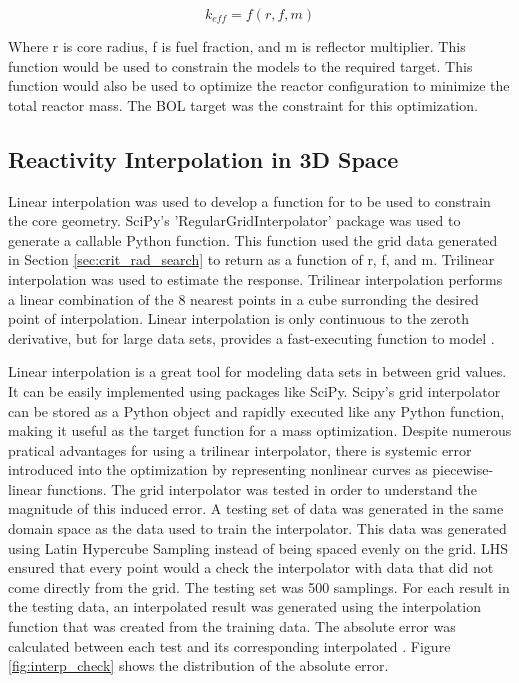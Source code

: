 \begin{equation}
    k_{eff} = f(r, f, m)
\label{eq:gen_keff}
\end{equation}

Where r is core radius, f is fuel fraction, and m is reflector multiplier. This
function would be used to constrain the models to the required \keff target.
This function would also be used to optimize the reactor configuration to
minimize the total reactor mass. The BOL \keff target was the constraint for
this optimization.

\subsection{Reactivity Interpolation in 3D Space}
Linear interpolation was used to develop a function for \keff to be used to
constrain the core geometry. SciPy's 'RegularGridInterpolator' package was used
to generate a callable Python function. This function used the grid data
generated in Section \ref{sec:crit_rad_search} to return \keff as a function of
r, f, and m. Trilinear interpolation was used to estimate the \keff response.
Trilinear interpolation performs a linear combination of the 8 nearest points in
a cube surronding the desired point of interpolation. Linear interpolation is
only continuous to the zeroth derivative, but for large data sets, provides a
fast-executing function to model \keff.

Linear interpolation is a great tool for modeling data sets in between grid
values. It can be easily implemented using packages like SciPy. Scipy's grid
interpolator can be stored as a Python object and rapidly executed like any
Python function, making it useful as the target function for a mass
optimization. Despite numerous pratical advantages for using a trilinear
interpolator, there is systemic error introduced into the optimization by
representing nonlinear curves as piecewise-linear functions. The grid
interpolator was tested in order to understand the magnitude of this induced
error. A testing set of data was generated in the same domain space as the data
used to train the interpolator. This data was generated using Latin Hypercube
Sampling instead of being spaced evenly on the grid. LHS ensured that every
point would a check the interpolator with data that did not come directly from
the grid. The testing set was 500 \keff samplings. For each \keff result in the
testing data, an interpolated result was generated using the interpolation
function that was created from the training data. The absolute error was calculated
between each test \keff and its corresponding interpolated \keff. Figure
\ref{fig:interp_check} shows the distribution of the absolute error.

